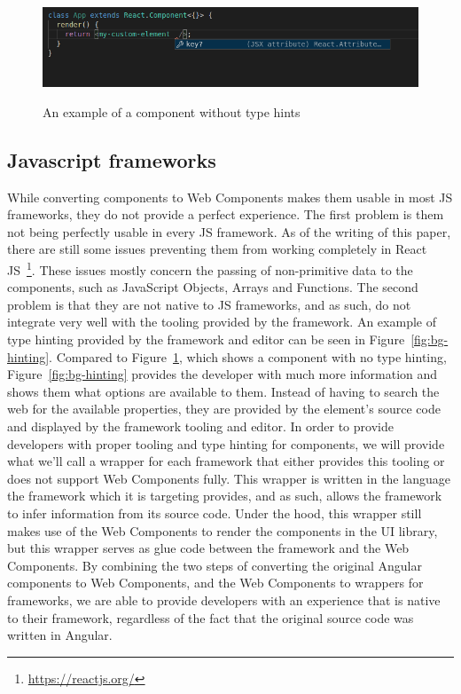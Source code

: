 \begin{figure}[h]
	\caption{An example of a component without type hints}
	\includegraphics[width=\columnwidth]{figures/background/no-hinting.png}
	\label{fig:bg-no-hinting}
	\centering
\end{figure}

\subsection{Javascript frameworks}\label{sec:bg-jsframeworks}
While converting components to Web Components makes them usable in most JS frameworks, they do not provide a perfect experience. The first problem is them not being perfectly usable in every JS framework. As of the writing of this paper, there are still some issues preventing them from working completely in React JS~\footnote{\url{https://reactjs.org/}}. These issues mostly concern the passing of non-primitive data to the components, such as JavaScript Objects, Arrays and Functions. The second problem is that they are not native to JS frameworks, and as such, do not integrate very well with the tooling provided by the framework. An example of type hinting provided by the framework and editor can be seen in Figure~\ref{fig:bg-hinting}. Compared to Figure~\ref{fig:bg-no-hinting}, which shows a component with no type hinting, Figure~\ref{fig:bg-hinting} provides the developer with much more information and shows them what options are available to them. Instead of having to search the web for the available properties, they are provided by the element's source code and displayed by the framework tooling and editor. In order to provide developers with proper tooling and type hinting for components, we will provide what we'll call a wrapper for each framework that either provides this tooling or does not support Web Components fully. This wrapper is written in the language the framework which it is targeting provides, and as such, allows the framework to infer information from its source code. Under the hood, this wrapper still makes use of the Web Components to render the components in the UI library, but this wrapper serves as glue code between the framework and the Web Components. By combining the two steps of converting the original Angular components to Web Components, and the Web Components to wrappers for frameworks, we are able to provide developers with an experience that is native to their framework, regardless of the fact that the original source code was written in Angular.